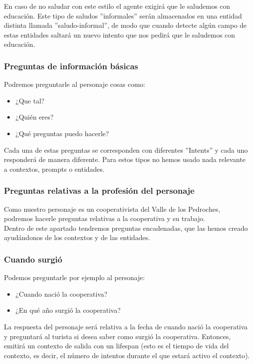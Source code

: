 En caso de no saludar con este estilo el agente exigirá que le saludemos con educación. Este tipo de saludos ''informales'' serán almacenados en una entidad distinta llamada ''saludo-informal'', de modo que cuando detecte algún campo de estas entidades saltará un nuevo intento que nos pedirá que le saludemos con educación.


\subsubsection{Preguntas de información básicas}

Podremos preguntarle al personaje cosas como:
\begin{itemize}
	\item ¿Que tal?
	\item ¿Quién eres?
	\item ¿Qué preguntas puedo hacerle?
\end{itemize}
Cada una de estas preguntas se corresponden con diferentes ''Intents'' y cada uno responderá de manera diferente. Para estos tipos no hemos usado nada relevante a contextos, prompts o entidades.

\subsubsection{Preguntas relativas a la profesión del personaje}

Como nuestro personaje es un cooperativista del Valle de los Pedroches, podremos hacerle preguntas relativas a la cooperativa y su trabajo.\\ 

Dentro de este apartado tendremos preguntas encadenadas, que las hemos creado ayudándonos de los contextos y de las entidades.

\subsubsection{Cuando surgió}

Podemos preguntarle por ejemplo al personaje:
\begin{itemize}
	\item ¿Cuando nació la cooperativa?
	\item ¿En qué año surgió la cooperativa?
\end{itemize}
La respuesta del personaje será relativa a la fecha de cuando nació la cooperativa y preguntará al turista si desea saber como surgió la cooperativa. Entonces, emitirá un contexto de salida con un lifespan (esto es el tiempo de vida del contexto, es decir, el número de intentos durante el que estará activo el contexto). \\


